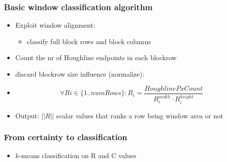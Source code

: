 \documentclass{beamer}
\begin{document}
\frame
{
	\frametitle{Basic window classification algorithm}
	\begin{itemize}
	\item <+-| alert@+> Exploit window alignment: 
		\begin{itemize}
		\item classify full block rows and block columns
		\end{itemize}
	\item <+-| alert@+> Count the nr of Houghline endpoints in each blockrow
	\item <+-| alert@+> discard blockrow size influence (normalize):
	\item <+-| alert@+> \[\forall Ri\in \{1..numRows\} : R_i = \frac{HoughlinePxCount}{R_i^{width} \cdot R_i^{height}}\]
	\item <+-| alert@+> Output: $||R||$ scalar values that ranks a row being window area or not
	\end{itemize}
	

}

\frame
{
}

\frame
{
}

\frame
{
}



\frame
{
	\frametitle{From certainty to classification}
	\begin{itemize}
	\item <+-| alert@+> $k$-means classification on R and C values

	\end{itemize}
}

\frame
{
}

\frame
{
}

\frame
{
}
\end{document}

